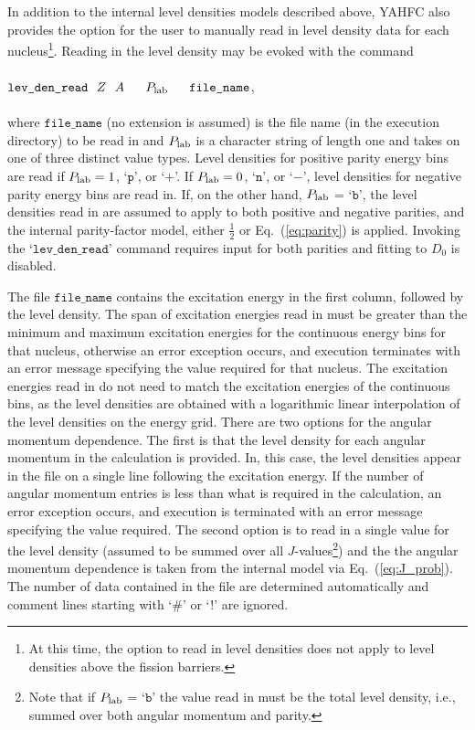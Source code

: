 \documentclass[
10pt,
showpacs,preprintnumbers,footinbib,
amsfonts,amsmath,amssymb,
aps,
prc,twocolumn,groupedaddress,superscriptaddress,
showkeys,
nofootinbib
]{revtex4-1}
\begin{document}
In addition to the internal level densities models described above, YAHFC also provides the option for the user to manually read in level density data for each nucleus\footnote{At this time, the option to read in level densities does not apply to level densities above the fission barriers.}. Reading in the level density may be evoked with the command\\
\\
 ${\texttt{lev\_den\_read}}~~Z~~A~~~~~P_{\rm lab}~~~~~{\texttt{file\_name}}$,\\
\\
where ${\texttt{file\_name}}$ (no extension is assumed) is the file name (in the execution directory) to be read in and $P_{\rm lab}$ is a character string of length one and takes on one of three distinct value types. Level densities for positive parity energy bins are read if $P_{\rm lab} = 1$, `${\texttt{p}}$', or `$+$'. If $P_{\rm lab} = 0$, `${\texttt{n}}$', or `$-$', level densities for negative parity energy bins are read in.  If, on the other hand, $P_{\rm lab}$ = `${\texttt{b}}$', the level densities read in are assumed to apply to both positive and negative parities, and the internal parity-factor model, either $\frac{1}{2}$ or Eq.~(\ref{eq:parity}) is applied. Invoking the `${\texttt{lev\_den\_read}}$' command requires input for both parities and fitting to $D_0$ is disabled.

The file ${\texttt{file\_name}}$ contains the excitation energy in the first column, followed by the level density. The span of excitation energies read in must be greater than the minimum and maximum excitation energies for the continuous energy bins for that nucleus, otherwise an error exception occurs, and execution terminates with an error message specifying the value required for that nucleus. The excitation energies read in do not need to match the excitation energies of the continuous bins, as the level densities are obtained with a logarithmic linear interpolation of the level densities on the energy grid. There are two options for the angular momentum dependence. The first is that the level density for each angular momentum in the calculation is provided. In, this case, the level densities appear in the file on a single line following the excitation energy. If the number of angular momentum entries is less than what is required in the calculation, an error exception occurs, and execution is terminated with an error message specifying the value required. The second option is to read in a single value for the level density (assumed to be summed over all $J$-values\footnote{Note that if $P_{\rm lab}$ = `${\texttt{b}}$' the value read in must be the total level density, i.e., summed over both angular momentum and parity.}) and the the angular momentum dependence is taken from the internal model via Eq.~(\ref{eq:J_prob}). The number of data contained in the file are determined automatically and comment lines starting with `\#' or `!' are ignored.
\end{document}
